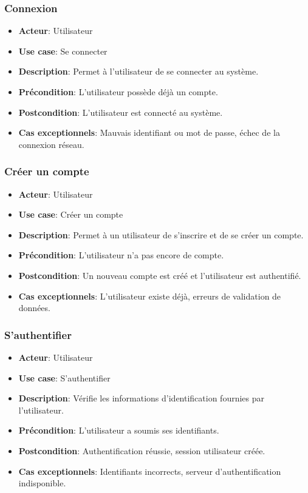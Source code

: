 \documentclass{article}
\begin{document}
\subsubsection*{Connexion}
\begin{itemize}
    \item \textbf{Acteur}: Utilisateur
    \item \textbf{Use case}: Se connecter
    \item \textbf{Description}: Permet à l'utilisateur de se connecter au système.
    \item \textbf{Précondition}: L'utilisateur possède déjà un compte.
    \item \textbf{Postcondition}: L'utilisateur est connecté au système.
    \item \textbf{Cas exceptionnels}: Mauvais identifiant ou mot de passe, échec de la connexion réseau.
\end{itemize}

\subsubsection*{Créer un compte}
\begin{itemize}
    \item \textbf{Acteur}: Utilisateur
    \item \textbf{Use case}: Créer un compte
    \item \textbf{Description}: Permet à un utilisateur de s’inscrire et de se créer un compte.
    \item \textbf{Précondition}: L’utilisateur n’a pas encore de compte.
    \item \textbf{Postcondition}: Un nouveau compte est créé et l'utilisateur est authentifié.
    \item \textbf{Cas exceptionnels}: L'utilisateur existe déjà, erreurs de validation de données.
\end{itemize}

\subsubsection*{S'authentifier}
\begin{itemize}
    \item \textbf{Acteur}: Utilisateur
    \item \textbf{Use case}: S'authentifier
    \item \textbf{Description}: Vérifie les informations d'identification fournies par l'utilisateur.
    \item \textbf{Précondition}: L'utilisateur a soumis ses identifiants.
    \item \textbf{Postcondition}: Authentification réussie, session utilisateur créée.
    \item \textbf{Cas exceptionnels}: Identifiants incorrects, serveur d’authentification indisponible.
\end{itemize}
\end{document}
